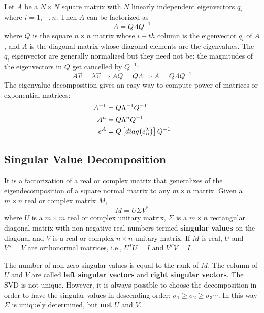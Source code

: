 \documentclass[12pt, letterpaper]{article}
\theoremstyle{definition}
\DeclarePairedDelimiter\autobracket{(}{)}
\newcommand{\br}[1]{\autobracket*{#1}}
\let\tb\textbf
\begin{document}
Let $A$ be a $N\times N$ square matrix with $N$ linearly independent eigenvectors $q_i$ where $i=1, \cdots, n$. Then $A$ can be factorized as 
\begin{equation}
A = Q \Lambda Q^{-1}
\end{equation}
where $Q$ is  the square $n\times n$ matrix whose $i-th$ column is the eigenvector $q_i$ of $A$, and $\Lambda$ is the diagonal matrix whose diagonal elements are the eigenvalues. The $q_i$ eigenvector are generally normalized but they need not be: the magnitudes of the eigenvectors in $Q$ get cancelled by $Q^{-1}$:
\begin{equation}
A\vec{v} = \lambda \vec{v}\Rightarrow AQ = Q\Lambda \Rightarrow A = Q\Lambda Q^{-1}
\end{equation}
The eigenvalue decomposition gives an easy way to compute power of matrices or exponential matrices:
\begin{equation}
\begin{aligned}
A^{-1} &= Q\Lambda^{-1}Q^{-1}\\
A^n    &=  Q\Lambda^{n}Q^{-1}\\
e^A    &=  Q\left[diag\br{e^\lambda_{ii}}\right]Q^{-1}\\
\end{aligned}
\end{equation}

\subsection{Singular Value Decomposition}
\label{SVD}
It is a factorization of a real or complex matrix that generalizes of the eigendecomposition of a square normal matrix to any $m\times n$ matrix. Given a $m\times n$ real or complex matrix $M$,
\begin{equation}
M = U \Sigma V^*
\end{equation}
where $U$ is a $m \times m$ real or complex unitary matrix, $\Sigma$ is a $m \times n$ rectangular diagonal matrix with non-negative real numbers termed \tb{singular values} on the diagonal and $V$ is a real or complex $n\times n$ unitary matrix. If $M$ is real, $U$ and $V*=V$ are orthonormal matrices, i.e., $U^TU=I$ and $V^TV=I$.

The number of non-zero singular values is equal to the rank of $M$. The column of $U$ and $V$ are called \tb{left singular vectors} and \tb{right singular vectors}. The SVD is not unique. However, it is always possible to choose the decomposition in order to have the singular values in descending order: $\sigma_1 \ge \sigma_2 \ge \sigma_3 \cdots$. In this way $\Sigma$ is uniquely determined, but \tb{not} $U$ and $V$.
\end{document}
